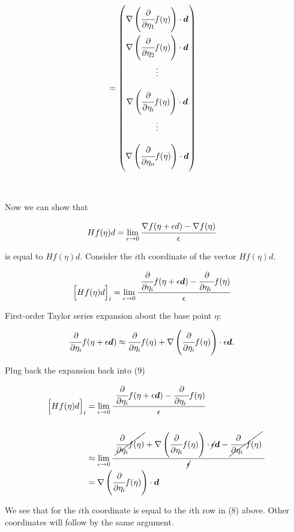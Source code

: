 \documentclass[]{article}
\begin{document}
\begin{align}
     &= \begin{pmatrix} 
    \\[-.85em]
   \nabla   \left( \cfrac{\partial }{\partial \eta_1 }  f(\eta) \right) \cdot {\bm d} \\[1.25em]
    \nabla   \left( \cfrac{\partial }{\partial \eta_2 }  f(\eta) \right) \cdot {\bm d} \\[1.25em]
    \vdots \\[1.25em]
    \nabla   \left( \cfrac{\partial }{\partial \eta_i }  f(\eta) \right) \cdot {\bm d} \\[1.25em]
    \vdots \\[1.25em]
    \nabla   \left( \cfrac{\partial }{\partial \eta_n }  f(\eta) \right) \cdot {\bm d} \\[1.25em]
    \end{pmatrix} 
 \end{align}

~

Now we can show that

\begin{align*}
     Hf(\eta)d &= \lim_{\epsilon \rightarrow 0} \cfrac{\nabla f(\eta + \epsilon d) - \nabla f(\eta)}{\epsilon} 
 \end{align*}

is equal to \(Hf(\eta)d\). Consider the \(i\)th coordinate of the vector
\(Hf(\eta)d\).

\begin{align}
     \Big[Hf(\eta)d\Big]_i &= 
     \lim_{\epsilon \rightarrow 0} \cfrac{ \ \cfrac{\partial }{\partial \eta_i }  f(\eta + \epsilon {\bm d}) -   \cfrac{\partial }{\partial \eta_i \ }   f(\eta)}{\epsilon}   
     \end{align}

First-order Taylor series expansion about the base point \(\eta\):

\begin{align*}
     \cfrac{\partial }{\partial \eta_i }  f(\eta + \epsilon {\bm d}) &\approx \cfrac{\partial }{\partial \eta_i }  f(\eta) + \nabla 
     \left( \cfrac{\partial }{\partial \eta_i }  f(\eta) \right) \cdot \epsilon {\bm d}. 
 \end{align*}

Plug back the expansion back into (9)

\begin{align*}
     \Big[Hf(\eta)d\Big]_i &= \lim_{\epsilon \rightarrow 0} \cfrac{ \ \cfrac{\partial }{\partial \eta_i }  f(\eta + \epsilon {\bm d}) -   \cfrac{\partial }{\partial \eta_i \ }   f(\eta)}{\epsilon}   \\
     \\
   & \approx \lim_{\epsilon \rightarrow 0} \cfrac{ \ \cancel{ \cfrac{ \partial }{\partial \eta_i }  f(\eta) } + \nabla 
     \left( \cfrac{\partial }{\partial \eta_i }  f(\eta) \right) \cdot \cancel{ \epsilon} {\bm d} - \cancel{ \cfrac{\partial }{\partial \eta_i \ }   f(\eta)} \ }{ \cancel{\epsilon }}   \\
     &= \nabla   \left( \cfrac{\partial }{\partial \eta_i }  f(\eta) \right) \cdot {\bm d}
\end{align*}

We see that for the \(i\)th coordinate is equal to the \(i\)th row in
(8) above. Other coordinates will follow by the same argument.
\end{document}
